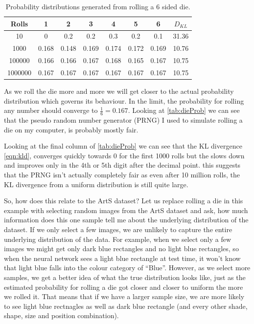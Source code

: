 \begin{table}
\centering
	\begin{tabular}{|c|c|c|c|c|c|c|c|}
	\hline
	Rolls & 1 & 2 & 3 & 4 & 5 & 6 & $D_{KL}$ \\ \hline
	10 & 0 & 0.2 & 0.2 & 0.3 & 0.2 & 0.1 & 31.36 \\ \hline
	1000 & 0.168 & 0.148 & 0.169 & 0.174 & 0.172 & 0.169 & 10.76 \\ \hline
	100000 & 0.166 & 0.166 & 0.167 & 0.168 & 0.165 & 0.167 & 10.75 \\ \hline
	1000000 & 0.167 & 0.167 & 0.167 & 0.167 & 0.167 & 0.167 & 10.75 \\ \hline
	\end{tabular}
	\caption{Probability distributions generated from rolling a 6 sided die.}
	\label{tab:dieProb}
\end{table}

As we roll the die more and more we will get closer to the actual probability distribution which governs its behaviour. In the limit, the probability for rolling any number should converge to $\frac{1}{6} = 0.167$. Looking at \autoref{tab:dieProb} we can see that the pseudo random number generator (PRNG) I used to simulate rolling a die on my computer, is probably mostly fair. 

Looking at the final column of \autoref{tab:dieProb} we can see that the KL divergence \autoref{eqn:kld}, converges quickly towards 0 for the first 1000 rolls but the slows down and improves only in the 4th or 5th digit after the decimal point. this suggests that the PRNG isn't actually completely fair as even after 10 million rolls, the KL divergence from a uniform distribution is still quite large.

So, how does this relate to the ArtS dataset? Let us replace rolling a die in this example with selecting random images from the ArtS dataset and ask, how much information does this one sample tell me about the underlying distribution of the dataset. If we only select a few images, we are unlikely to capture the entire underlying distribution of the data.
For example, when we select only a few images we might get only dark blue rectangles and no light blue rectangles, so when the neural network sees a light blue rectangle at test time, it won't know that light blue falls into the colour category of ``Blue''. However, as we select more samples, we get a better idea of what the true distribution looks like, just as the estimated probability for rolling a die got closer and closer to uniform the more we rolled it. That means that if we have a larger sample size, we are more likely to see light blue rectnagles as well as dark blue rectangle (and every other shade, shape, size and position combination). 

